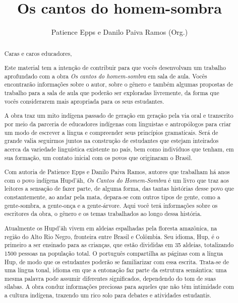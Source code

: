 \documentclass[11pt]{extarticle}
\newcommand{\AutorLivro}{Patience Epps e Danilo Paiva Ramos (Org.)}
\newcommand{\TituloLivro}{Os cantos do homem-sombra}
\newcommand{\colaborador}{Gabriela Karam}
\begin{document}
\title{\TituloLivro}
\author{\AutorLivro}
\def\authornotes{\colaborador}

\date{}
\maketitle


\tableofcontents


\begin{abstract}

Caras e caros educadores,

Este material tem a intenção de contribuir para que vocês desenvolvam um trabalho aprofundado com a obra \textit{Os cantos do homem-sombra} em sala de aula.
Vocês encontrarão informações sobre o autor, sobre o gênero e também 
algumas propostas de trabalho para a sala de aula que poderão ser exploradas livremente, 
da forma que vocês considerarem mais apropriada para os seus estudantes.

A obra traz um mito indígena passado de geração em geração pela via oral e transcrito por meio da parceria de educadores indígenas com linguistas e antropólogos para criar um modo de escrever a língua e compreender seus princípios gramaticais. Será de grande valia seguirmos juntos na construção de estudantes que estejam inteirados acerca da variedade linguística existente no país, bem como indivíduos que tenham, em sua formação, um contato inicial com os povos que originaram o Brasil.

Com autoria de Patience Epps e Danilo Paiva Ramos, autores que trabalham há anos com o povo indígena Hupd'äh, \textit{Os Cantos do Homem-Sombra} é um livro que traz aos leitores a sensação de fazer parte, de alguma forma, das tantas histórias desse povo que constantemente, ao andar pela mata, depara-se com outros tipos de gente, como a gente-sombra, a gente-onça e a gente-árvore. Aqui você terá informações sobre os escritores da obra, o gênero e os temas trabalhados ao longo dessa história. 

Atualmente os Hupd'äh vivem em aldeias espalhadas pela floresta amazônica, na região do Alto Rio Negro, fronteira entre Brasil e Colômbia. Seu idioma, Hup, é o primeiro a ser ensinado para as crianças, que estão divididas em 35 aldeias, totalizando 1500 pessoas na população total. O português compartilha as páginas com a língua Hup, de modo que os estudantes poderão se familiarizar com essa escrita. Trata-se de uma língua tonal, idioma em que a entonação faz parte da estrutura semântica: uma mesma palavra pode assumir diferentes significados, dependendo do tom de suas sílabas. A obra conduz informações preciosas para aqueles que não têm intimidade com a cultura indígena, trazendo um rico solo para debates e atividades estudantis.


\end{abstract}
\end{document}
